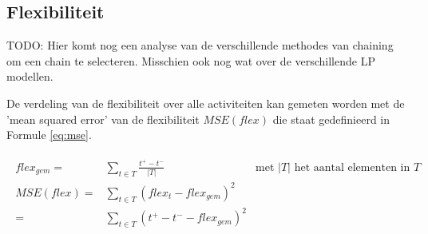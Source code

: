 \subsection{Flexibiliteit}
TODO: Hier komt nog een analyse van de verschillende methodes van chaining om een chain te selecteren. Misschien ook nog wat over de verschillende LP modellen.

De verdeling van de flexibiliteit over alle activiteiten kan gemeten worden met de 'mean squared error' van de flexibiliteit $MSE(flex)$ die staat gedefinieerd in Formule \ref{eq:mse}.

\begin{align}
\label{eq:mse}
\begin{aligned}
    flex_{gem} =& \sum_{t \in T} \frac{t^+ - t^-}{|T|}      & \text{met } |T| \text{ het aantal elementen in } T\\
    MSE(flex) =& \sum_{t \in T} (flex_t - flex_{gem})^2     & \\
               =& \sum_{t \in T} (t^+ - t^- - flex_{gem})^2 & \\
\end{aligned}
\end{align}


